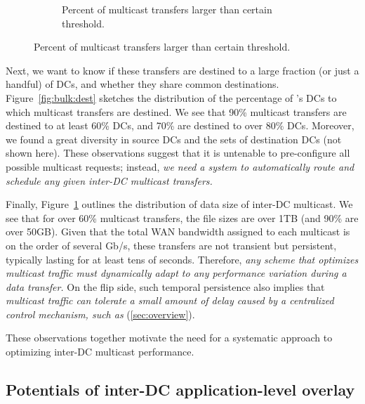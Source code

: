 \begin{figure}[t]
\begin{subfigure}[b]{0.23\textwidth}
                \caption{Percent of multicast transfers larger than certain threshold.}
                \label{fig:bulk:size}
        \end{subfigure}
        \vspace{-0.4cm}
        \label{fig:bulk}
\vspace{-0.4cm}
\end{figure}

\vspace{0.1cm}
Next, we want to know if these transfers are destined to a large 
fraction (or just a handful) of DCs, and whether they share common 
destinations. Figure~\ref{fig:bulk:dest} sketches the distribution 
of the percentage of \company's DCs to which multicast transfers 
are destined. We see that 90\% multicast transfers are destined to 
at least 60\% DCs, and 70\% are destined to over 80\% DCs. Moreover, 
we found a great diversity in source DCs and the sets of destination
DCs (not shown here). These observations suggest that it is untenable
to pre-configure all possible multicast requests; instead, {\em we 
need a system to automatically route and schedule any given inter-DC 
multicast transfers.}

Finally, Figure~\ref{fig:bulk:size} outlines the distribution of data 
size of inter-DC multicast. We see that for over 60\% multicast 
transfers, the file sizes are over 1TB (and 90\% are over 50GB).
Given that the total WAN bandwidth assigned to each multicast is on 
the order of several Gb/s, these transfers are not transient but 
persistent, typically lasting for at least tens of seconds.
Therefore, {\em any scheme that optimizes multicast traffic must
dynamically adapt to any performance variation during a data transfer.}
On the flip side, such temporal persistence also implies that {\em 
multicast traffic can tolerate a small amount of delay caused by 
a centralized control mechanism, such as \name} 
(\Section\ref{sec:overview}).


\vspace{0.1cm}
These observations together motivate the need for a systematic approach
to optimizing inter-DC multicast performance.

\subsection{Potentials of inter-DC application-level overlay}
\label{subsec:motivation:case-for}


